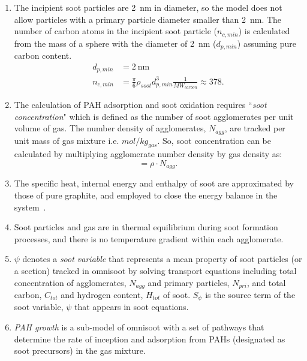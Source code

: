\begin{enumerate}
\item The incipient soot particles are 2~nm in diameter, so the model does not allow particles with a primary particle diameter smaller than 2~nm. The number of carbon atoms in the incipient soot particle ($n_{c,min}$) is calculated from the mass of a sphere with the diameter of 2~nm ($d_{p,min}$) assuming pure carbon content.
\begin{equation}
	\begin{split}
	d_{p,min}&=2~\mathrm{nm} \\
	n_{c,min}& =\frac{\pi}{6}\rho_{soot}d^3_{p,min}\frac{1}{MW_{carbon}}\approx378
	\label{eqn:dp_min}.
	\end{split}
\end{equation}
\item The calculation of PAH adsorption and soot oxidation requires ``\textit{soot concentration}" which is defined as the number of soot agglomerates per unit volume of gas. The number density of agglomerates,  ${N_{agg}}$, are tracked per unit mass of gas mixture i.e. ${mol/kg_{gas}}$. So, soot concentration can be calculated by multiplying agglomerate number density by gas density as:
\begin{equation}
	[\mathrm{soot}] = \rho\cdot {N_{agg}}
	\label{eqn:sootconcen}.
\end{equation}

\item The specific heat, internal energy and enthalpy of soot are approximated by those of pure graphite, and employed to close the energy balance in the system~\cite{mcbride1993coefficients}.

\item Soot particles and gas are in thermal equilibrium during soot formation processes, and there is no temperature gradient within each agglomerate.


\item $\psi$ denotes a \textit{soot variable} that represents a mean property of soot particles (or a section) tracked in omnisoot by solving transport equations including total concentration of agglomerates, $N_{agg}$ and primary particles, $N_{pri}$, and total carbon, $C_{tot}$ and hydrogen content, $H_{tot}$ of soot. $S_{\psi}$ is the source term of the soot variable, $\psi$ that appears in soot equations. %

\item \textit{PAH growth} is a sub-model of omnisoot with a set of pathways that determine the rate of inception and adsorption from PAHs (designated as soot precursors) in the gas mixture.


\end{enumerate}
